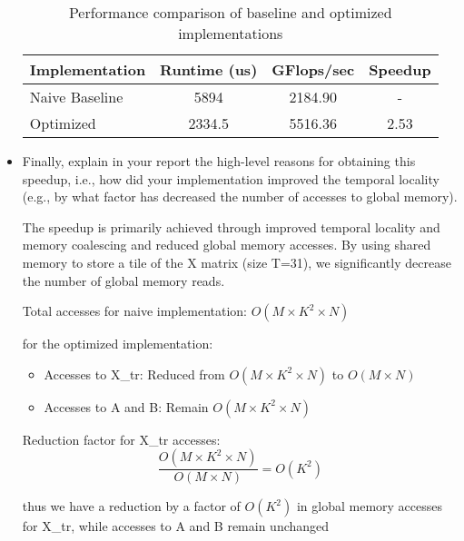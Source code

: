 \documentclass{article}
\begin{document}
\begin{itemize}
    \begin{table}[h]
        \centering
        \begin{tabular}{|l|c|c|c|}
        \hline
        \textbf{Implementation} & \textbf{Runtime (us)} & \textbf{GFlops/sec} & \textbf{Speedup} \\
        \hline
        Naive Baseline & 5894 & 2184.90 & -\\
        Optimized & 2334.5 & 5516.36 & 2.53 \\
        \hline
        \end{tabular}
        \caption{Performance comparison of baseline and optimized implementations}
        \label{tab:performance-comparison}
    \end{table}
    
    \item Finally, explain in your report the high-level reasons for obtaining
    this speedup, i.e., how did your implementation improved the temporal
    locality (e.g., by what factor has decreased the number of accesses to
    global memory).

    The speedup is primarily achieved through improved temporal locality and memory coalescing and reduced global memory accesses.
    By using shared memory to store a tile of the X matrix (size T=31), we significantly decrease the number of global memory reads. 


    Total accesses for naive implementation: $O(M \times K^2 \times N)$

    for the optimized implementation:
    \begin{itemize}
        \item Accesses to X\_tr: Reduced from $O(M \times K^2 \times N)$ to $O(M \times N)$
        \item Accesses to A and B: Remain $O(M \times K^2 \times N)$
    \end{itemize}

    Reduction factor for X\_tr accesses:
    \[
    \frac{O(M \times K^2 \times N)}{O(M \times N)} = O(K^2)
    \]

    thus we have a reduction by a factor of $O(K^2)$ in global memory accesses for X\_tr, while accesses to A and B remain unchanged


\end{itemize}
\end{document}

